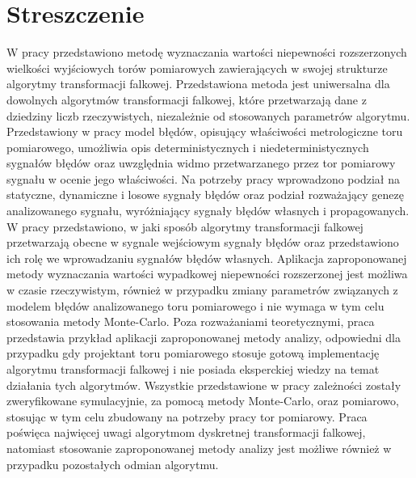 \chapter*{Streszczenie}

W pracy przedstawiono metodę wyznaczania wartości niepewności rozszerzonych wielkości wyjściowych torów pomiarowych zawierających w swojej strukturze algorytmy transformacji falkowej. Przedstawiona metoda jest uniwersalna dla dowolnych algorytmów transformacji falkowej, które przetwarzają dane z dziedziny liczb rzeczywistych, niezależnie od stosowanych parametrów algorytmu. Przedstawiony w pracy model błędów, opisujący właściwości metrologiczne toru pomiarowego, umożliwia opis deterministycznych i niedeterministycznych sygnałów błędów oraz uwzględnia widmo przetwarzanego przez tor pomiarowy sygnału w ocenie jego właściwości. Na potrzeby pracy wprowadzono podział na statyczne, dynamiczne i losowe sygnały błędów oraz podział rozważający genezę analizowanego sygnału, wyróżniający sygnały błędów własnych i propagowanych. W pracy przedstawiono, w jaki sposób algorytmy transformacji falkowej przetwarzają obecne w sygnale wejściowym sygnały błędów oraz przedstawiono ich rolę we wprowadzaniu sygnałów błędów własnych. Aplikacja zaproponowanej metody wyznaczania wartości wypadkowej niepewności rozszerzonej jest możliwa w czasie rzeczywistym, również w przypadku zmiany parametrów związanych z modelem błędów analizowanego toru pomiarowego i nie wymaga w tym celu stosowania metody Monte-Carlo. Poza rozważaniami teoretycznymi, praca przedstawia przykład aplikacji zaproponowanej metody analizy, odpowiedni dla przypadku gdy projektant toru pomiarowego stosuje gotową implementację algorytmu transformacji falkowej i nie posiada eksperckiej wiedzy na temat działania tych algorytmów. Wszystkie przedstawione w pracy zależności zostały zweryfikowane symulacyjnie, za pomocą metody Monte-Carlo, oraz pomiarowo, stosując w tym celu zbudowany na potrzeby pracy tor pomiarowy. Praca poświęca najwięcej uwagi algorytmom dyskretnej transformacji falkowej, natomiast stosowanie zaproponowanej metody analizy jest możliwe również w przypadku pozostałych odmian algorytmu.

